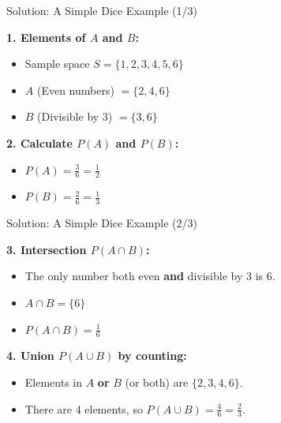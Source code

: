 \begin{frame}{Solution: A Simple Dice Example (1/3)}
    \begin{solution}
        \textbf{1. Elements of $A$ and $B$:}
        \begin{itemize}
            \item Sample space $S = \{1, 2, 3, 4, 5, 6\}$
            \item $A$ (Even numbers) $= \{2, 4, 6\}$
            \item $B$ (Divisible by 3) $= \{3, 6\}$
        \end{itemize}
        
        \pause \vspace{0.4cm}
        
        \textbf{2. Calculate $P(A)$ and $P(B)$:}
        \begin{itemize}
            \item $P(A) = \frac{3}{6} = \frac{1}{2}$
            \item $P(B) = \frac{2}{6} = \frac{1}{3}$
        \end{itemize}
    \end{solution}
\end{frame}

\begin{frame}{Solution: A Simple Dice Example (2/3)}
    \begin{solution}
        \textbf{3. Intersection $P(A \cap B)$:}
        \begin{itemize}
            \item The only number both even \textbf{and} divisible by 3 is 6.
            \item $A \cap B = \{6\}$
            \item $P(A \cap B) = \frac{1}{6}$
        \end{itemize}

        \pause \vspace{0.4cm}

        \textbf{4. Union $P(A \cup B)$ by counting:}
        \begin{itemize}
            \item Elements in $A$ \textbf{or} $B$ (or both) are $\{2, 3, 4, 6\}$.
            \item There are 4 elements, so $P(A \cup B) = \frac{4}{6} = \frac{2}{3}$.
        \end{itemize}
    \end{solution}
\end{frame}

